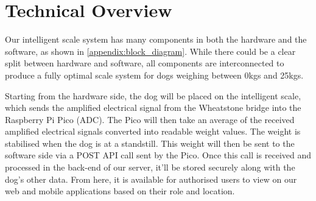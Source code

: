 
\chapter{Technical Overview}

Our intelligent scale system has many components in both the hardware and the software, as shown in \ref{appendix:block_diagram}. While there could be a clear split between hardware and software, all components are interconnected to produce a fully optimal scale system for dogs weighing between 0kgs and 25kgs.

Starting from the hardware side, the dog will be placed on the intelligent scale, which sends the amplified electrical signal from the Wheatstone bridge into the Raspberry Pi Pico (ADC). The Pico will then take an average of the received amplified electrical signals converted into readable weight values. The weight is stabilised when the dog is at a standstill. This weight will then be sent to the software side via a POST API call sent by the Pico. Once this call is received and processed in the back-end of our server, it'll be stored securely along with the dog's other data. From here, it is available for authorised users to view on our web and mobile applications based on their role and location.